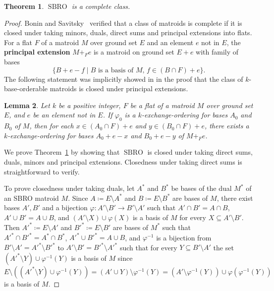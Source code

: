 \documentclass[11pt,a4paper]{article}
\theoremstyle{plain}
\newtheorem{thm}{Theorem}
\newtheorem{lem}[thm]{Lemma}
\theoremstyle{definition}
\DeclareMathOperator*{\sbro}{SBRO}
\begin{document}
\begin{thm}\label{thm:complete}
$\sbro$ is a complete class.
\end{thm}
\begin{proof}
Bonin and Savitsky~\cite{bonin2016infinite} verified that a class of matroids is complete if it is closed under taking minors, duals, direct sums and principal extensions into flats. For a flat $F$ of a matroid $M$ over ground set $E$ and an element $e$ not in $E$,  the \textbf{principal extension} $M+_{F} e$ is a matroid on ground set $E+e$ with family of bases \[\{B+e-f \mid B\text{ is a basis of $M$, } f \in (B \cap F) + e\}.\]
The following statement was implicitly showed in \cite{bonin2016infinite} in the proof that the class of $k$-base-orderable matroids is closed under principal extensions.
\begin{lem} \label{lem:principal}
Let $k$ be a positive integer, $F$ be a flat of a matroid $M$ over ground set $E$, and $e$ be an element not in $E$. If $\varphi_0$ is a $k$-exchange-ordering for bases $A_0$ and $B_0$ of $M$, then for each $x \in (A_0 \cap F)+e$ and $y \in (B_0 \cap F)+e$, there exists a $k$-exchange-ordering for bases $A_0 + e - x$ and $B_0 + e - y$ of $M+_{F} e$.   
\end{lem}

We prove Theorem~\ref{thm:complete} by showing that $\sbro$ is closed under taking direct sums, duals, minors and principal extensions. Closedness under taking direct sums is straightforward to verify. 

To prove closedness under taking duals, let $A^*$ and $B^*$ be bases of the dual $M^*$ of an SBRO matroid $M$. Since $A \coloneqq E\setminus A^*$ and $B \coloneqq E\setminus B^*$ are bases of $M$, there exist bases $A', B'$ and a bijection $\varphi\colon A' \setminus B' \to B' \setminus A'$ such that $A' \cap B' = A \cap B$, $A' \cup B' = A \cup B$, and $(A' \setminus X) \cup \varphi(X)$ is a basis of $M$ for every $X \subseteq A' \setminus B'$. Then $A'^{*} \coloneqq E \setminus A'$ and $B'^{*} \coloneqq E \setminus B'$ are bases of $M^*$ such that $A'^{*} \cap B'^{*} = A^* \cap B^*$, $A'^* \cup B'^* = A\cup B$, and $\varphi^{-1}$ is a bijection from $B' \setminus A' = A'^{*} \setminus B'^{*}$ to $A' \setminus B' = B'^{*} \setminus A'^{*}$ such that for every $Y \subseteq B' \setminus A'$ the set $(A'^{*} \setminus Y) \cup \varphi^{-1}(Y)$ is a basis of $M$ since $E \setminus \left((A'^{*} \setminus Y) \cup \varphi^{-1}(Y)\right) = (A'\cup Y) \setminus \varphi^{-1}(Y) = (A'\setminus \varphi^{-1}(Y)) \cup \varphi\left(\varphi^{-1}(Y)\right)$ is a basis of $M$.


\end{proof}
\end{document}
